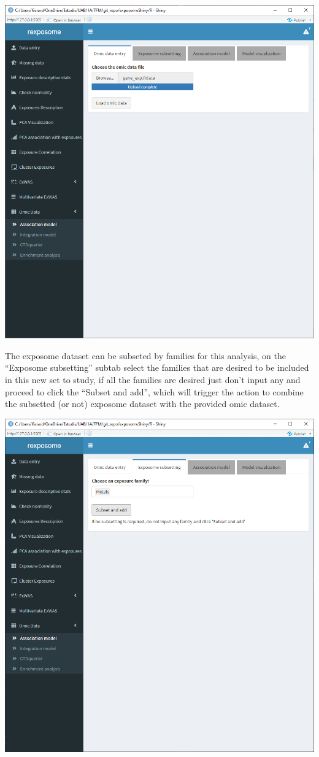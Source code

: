 \documentclass[
]{book}
\begin{document}
\includegraphics{images/analysis9_2.png}

The exposome dataset can be subseted by families for this analysis, on the ``Exposome subsetting'' subtab select the families that are desired to be included in this new set to study, if all the families are desired just don't input any and proceed to click the ``Subset and add'', which will trigger the action to combine the subsetted (or not) exposome dataset with the provided omic dataset.

\includegraphics{images/analysis9_3.png}
\end{document}
